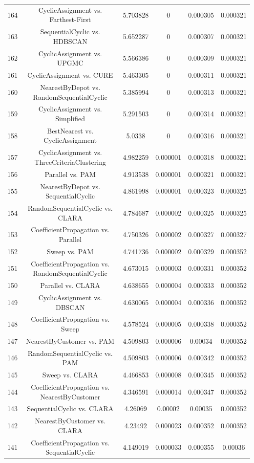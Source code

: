 \documentclass[a4paper,10pt]{article}
\begin{document}
\begin{landscape}
\begin{table}[!htp]
\begin{tabular}{cccccc}
164&CyclicAssignment vs. Farthest-First&5.703828&0&0.000305&0.000321\\
163&SequentialCyclic vs. HDBSCAN&5.652287&0&0.000307&0.000321\\
162&CyclicAssignment vs. UPGMC&5.566386&0&0.000309&0.000321\\
161&CyclicAssignment vs. CURE&5.463305&0&0.000311&0.000321\\
160&NearestByDepot vs. RandomSequentialCyclic&5.385994&0&0.000313&0.000321\\
159&CyclicAssignment vs. Simplified&5.291503&0&0.000314&0.000321\\
158&BestNearest vs. CyclicAssignment&5.0338&0&0.000316&0.000321\\
157&CyclicAssignment vs. ThreeCriteriaClustering&4.982259&0.000001&0.000318&0.000321\\
156&Parallel vs. PAM&4.913538&0.000001&0.000321&0.000321\\
155&NearestByDepot vs. SequentialCyclic&4.861998&0.000001&0.000323&0.000325\\
154&RandomSequentialCyclic vs. CLARA&4.784687&0.000002&0.000325&0.000325\\
153&CoefficientPropagation vs. Parallel&4.750326&0.000002&0.000327&0.000327\\
152&Sweep vs. PAM&4.741736&0.000002&0.000329&0.000352\\
151&CoefficientPropagation vs. RandomSequentialCyclic&4.673015&0.000003&0.000331&0.000352\\
150&Parallel vs. CLARA&4.638655&0.000004&0.000333&0.000352\\
149&CyclicAssignment vs. DBSCAN&4.630065&0.000004&0.000336&0.000352\\
148&CoefficientPropagation vs. Sweep&4.578524&0.000005&0.000338&0.000352\\
147&NearestByCustomer vs. PAM&4.509803&0.000006&0.00034&0.000352\\
146&RandomSequentialCyclic vs. PAM&4.509803&0.000006&0.000342&0.000352\\
145&Sweep vs. CLARA&4.466853&0.000008&0.000345&0.000352\\
144&CoefficientPropagation vs. NearestByCustomer&4.346591&0.000014&0.000347&0.000352\\
143&SequentialCyclic vs. CLARA&4.26069&0.00002&0.00035&0.000352\\
142&NearestByCustomer vs. CLARA&4.23492&0.000023&0.000352&0.000352\\
141&CoefficientPropagation vs. SequentialCyclic&4.149019&0.000033&0.000355&0.00036\\

\end{tabular}
\end{table}
\end{landscape}
\end{document}

